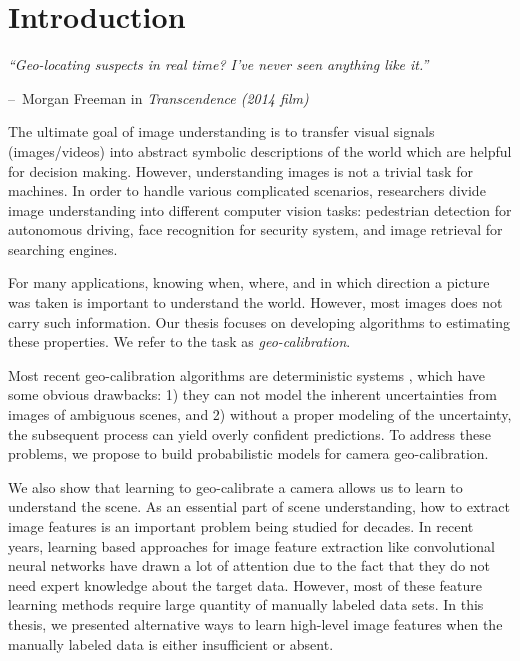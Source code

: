 \chapter{Introduction}
\label{chap:intro}

\makeatletter
\newenvironment{chapquote}[2][2em]
{\setlength{\@tempdima}{#1} \def\chapquote@author{#2} \parshape 1
  \@tempdima \dimexpr\textwidth-2\@tempdima\relax \itshape}
{\par\normalfont\hfill--\
\chapquote@author\hspace*{\@tempdima}\par\bigskip}
\makeatother

\begin{chapquote}{Morgan Freeman in {\em Transcendence (2014 film)}}
  ``Geo-locating suspects in real time? I've never seen anything like
it.''
\end{chapquote}

The ultimate goal of image understanding is to transfer visual
signals (images/videos) into abstract symbolic descriptions of the
world which are helpful for decision making.
However, understanding images is not a trivial task for machines.
In order to handle various complicated scenarios, researchers divide
image understanding into different computer vision tasks: pedestrian
detection for autonomous driving, face recognition for security
system, and image retrieval for searching engines.

For many applications, knowing when, where, and in which direction a
picture was taken is important to understand the world. However, most
images does not carry such information. Our thesis focuses on
developing algorithms to estimating these properties. We
refer to the task as {\em geo-calibration}.

Most recent geo-calibration algorithms are deterministic systems
\todo{citations}, 
which have some obvious drawbacks: 1) they can not model the inherent
uncertainties from images of ambiguous scenes, and 2) without a proper
modeling of the uncertainty, the subsequent process can yield overly
confident predictions. To address these problems, we propose to build
probabilistic models for camera geo-calibration.

We also show that learning to geo-calibrate a camera allows us to
learn to understand the scene.
As an essential part of scene understanding, how to extract image
features is an important problem being studied for decades.  In
recent years, learning based approaches for image feature extraction
like convolutional neural networks have drawn a lot of attention due
to the fact that they do not need expert knowledge about the target
data. However, most of these feature learning methods require large
quantity of manually labeled data sets.  In this thesis, we presented
alternative ways to learn high-level image features when the
manually labeled data is either insufficient or absent.


